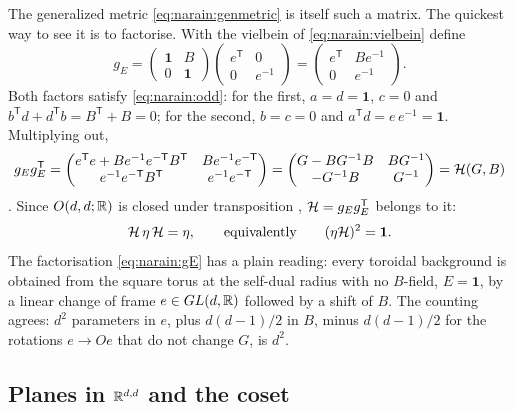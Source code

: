 The generalized metric \eqref{eq:narain:genmetric} is itself such a matrix. The quickest way
to see it is to factorise. With the vielbein of \eqref{eq:narain:vielbein} define
\begin{equation}\label{eq:narain:gE}
 g_E=\begin{pmatrix}\mathbf 1&B\\0&\mathbf 1\end{pmatrix}
 \begin{pmatrix}e^{\mathsf T}&0\\0&e^{-1}\end{pmatrix}
 =\begin{pmatrix}e^{\mathsf T}&Be^{-1}\\0&e^{-1}\end{pmatrix}.
\end{equation}
Both factors satisfy \eqref{eq:narain:odd}: for the first, $a=d=\mathbf 1$, $c=0$ and
$b^{\mathsf T}d+d^{\mathsf T}b=B^{\mathsf T}+B=0$; for the second, $b=c=0$ and
$a^{\mathsf T}d=e\,e^{-1}=\mathbf 1$. Multiplying out,
\begin{equation}\label{eq:narain:HgE}
 g_Eg_E^{\mathsf T}
 =\begin{pmatrix}e^{\mathsf T}e+Be^{-1}e^{-\mathsf T}B^{\mathsf T}&Be^{-1}e^{-\mathsf T}\\
 e^{-1}e^{-\mathsf T}B^{\mathsf T}&e^{-1}e^{-\mathsf T}\end{pmatrix}
 =\begin{pmatrix}G-BG^{-1}B&BG^{-1}\\-G^{-1}B&G^{-1}\end{pmatrix}=\mathcal{H}(G,B)
\end{equation}
. Since $O(d,d;\mathbb{R})$ is closed under transposition
, $\mathcal{H}=g_Eg_E^{\mathsf T}$ belongs to it:
\begin{equation}\label{eq:narain:HetaH}
 \mathcal{H}\,\eta\,\mathcal{H}=\eta,\qquad\text{equivalently}\qquad(\eta\mathcal{H})^2=\mathbf 1 .
\end{equation}
The factorisation \eqref{eq:narain:gE} has a plain reading: every toroidal background is
obtained from the square torus at the self-dual radius with no $B$-field, $E=\mathbf 1$,
by a linear change of frame $e\in GL(d,\mathbb{R})$ followed by a shift of $B$. The counting agrees:
$d^2$ parameters in $e$, plus $d(d-1)/2$ in $B$, minus $d(d-1)/2$ for the rotations
$e\to Oe$ that do not change $G$, is $d^2$.

\subsection{Planes in \texorpdfstring{$\mathbb{R}^{d,d}$}{R(d,d)} and the coset}

